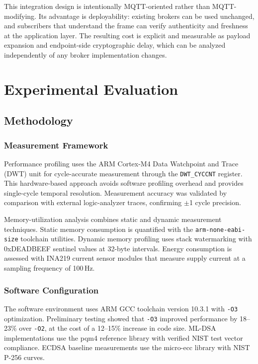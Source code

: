 \documentclass[final, twoside]{IEEEtran} %
\begin{document}
This integration design is intentionally MQTT-oriented rather than MQTT-modifying. Its advantage is deployability: existing brokers can be used unchanged, and subscribers that understand the frame can verify authenticity and freshness at the application layer. The resulting cost is explicit and measurable as payload expansion and endpoint-side cryptographic delay, which can be analyzed independently of any broker implementation changes.


\section{Experimental Evaluation}\label{sec:evaluation}

\subsection{Methodology}\label{sec:methodology}

\subsubsection{Measurement Framework}

Performance profiling uses the ARM Cortex-M4 Data Watchpoint and Trace (DWT) unit for cycle-accurate measurement through the \texttt{DWT\_CYCCNT} register. This hardware-based approach avoids software profiling overhead and provides single-cycle temporal resolution. Measurement accuracy was validated by comparison with external logic-analyzer traces, confirming $\pm$1 cycle precision.

Memory-utilization analysis combines static and dynamic measurement techniques. Static memory consumption is quantified with the \texttt{arm-none-eabi-size} toolchain utilities. Dynamic memory profiling uses stack watermarking with 0xDEADBEEF sentinel values at 32-byte intervals. Energy consumption is assessed with INA219 current sensor modules that measure supply current at a sampling frequency of 100\,Hz.

\subsubsection{Software Configuration}

The software environment uses ARM GCC toolchain version 10.3.1 with \texttt{-O3} optimization. Preliminary testing showed that \texttt{-O3} improved performance by 18--23\% over \texttt{-O2}, at the cost of a 12--15\% increase in code size. ML-DSA implementations use the pqm4 reference library with verified NIST test vector compliance. ECDSA baseline measurements use the micro-ecc library with NIST P-256 curves.
\end{document}

